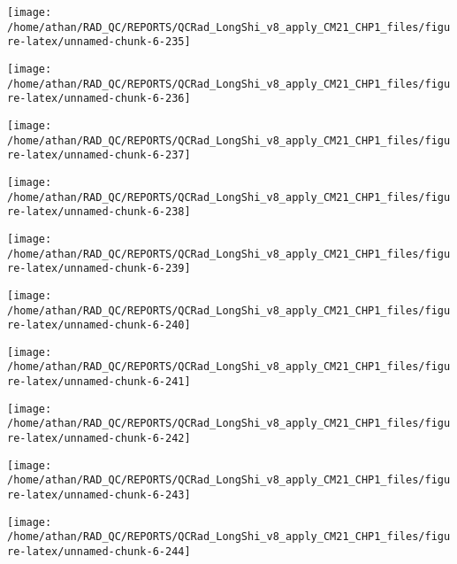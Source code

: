 \documentclass[
  10pt,
  a4paper,oneside]{article}
\begin{document}
\begin{center}\texttt{[image: /home/athan/RAD\_QC/REPORTS/QCRad\_LongShi\_v8\_apply\_CM21\_CHP1\_files/figure-latex/unnamed-chunk-6-235]} \end{center}

\begin{center}\texttt{[image: /home/athan/RAD\_QC/REPORTS/QCRad\_LongShi\_v8\_apply\_CM21\_CHP1\_files/figure-latex/unnamed-chunk-6-236]} \end{center}

\begin{center}\texttt{[image: /home/athan/RAD\_QC/REPORTS/QCRad\_LongShi\_v8\_apply\_CM21\_CHP1\_files/figure-latex/unnamed-chunk-6-237]} \end{center}

\begin{center}\texttt{[image: /home/athan/RAD\_QC/REPORTS/QCRad\_LongShi\_v8\_apply\_CM21\_CHP1\_files/figure-latex/unnamed-chunk-6-238]} \end{center}

\begin{center}\texttt{[image: /home/athan/RAD\_QC/REPORTS/QCRad\_LongShi\_v8\_apply\_CM21\_CHP1\_files/figure-latex/unnamed-chunk-6-239]} \end{center}

\begin{center}\texttt{[image: /home/athan/RAD\_QC/REPORTS/QCRad\_LongShi\_v8\_apply\_CM21\_CHP1\_files/figure-latex/unnamed-chunk-6-240]} \end{center}

\begin{center}\texttt{[image: /home/athan/RAD\_QC/REPORTS/QCRad\_LongShi\_v8\_apply\_CM21\_CHP1\_files/figure-latex/unnamed-chunk-6-241]} \end{center}

\begin{center}\texttt{[image: /home/athan/RAD\_QC/REPORTS/QCRad\_LongShi\_v8\_apply\_CM21\_CHP1\_files/figure-latex/unnamed-chunk-6-242]} \end{center}

\begin{center}\texttt{[image: /home/athan/RAD\_QC/REPORTS/QCRad\_LongShi\_v8\_apply\_CM21\_CHP1\_files/figure-latex/unnamed-chunk-6-243]} \end{center}

\begin{center}\texttt{[image: /home/athan/RAD\_QC/REPORTS/QCRad\_LongShi\_v8\_apply\_CM21\_CHP1\_files/figure-latex/unnamed-chunk-6-244]} \end{center}
\end{document}
